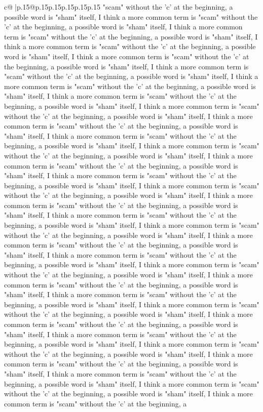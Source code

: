 \documentclass{article}
\begin{document}
{\begin{supertabular}{c@{$\;$}|p{.15\linewidth}@{}p{.15\linewidth}p{.15\linewidth}p{.15\linewidth}p{.15\linewidth}p{.15\linewidth}}
{{{"scam" without the 'c' at the beginning, a possible word is "sham" itself, I think a more common term is "scam" without the 'c' at the beginning, a possible word is "sham" itself, I think a more common term is "scam" without the 'c' at the beginning, a possible word is "sham" itself, I think a more common term is "scam" without the 'c' at the beginning, a possible word is "sham" itself, I think a more common term is "scam" without the 'c' at the beginning, a possible word is "sham" itself, I think a more common term is "scam" without the 'c' at the beginning, a possible word is "sham" itself, I think a more common term is "scam" without the 'c' at the beginning, a possible word is "sham" itself, I think a more common term is "scam" without the 'c' at the beginning, a possible word is "sham" itself, I think a more common term is "scam" without the 'c' at the beginning, a possible word is "sham" itself, I think a more common term is "scam" without the 'c' at the beginning, a possible word is "sham" itself, I think a more common term is "scam" without the 'c' at the beginning, a possible word is "sham" itself, I think a more common term is "scam" without the 'c' at the beginning, a possible word is "sham" itself, I think a more common term is "scam" without the 'c' at the beginning, a possible word is "sham" itself, I think a more common term is "scam" without the 'c' at the beginning, a possible word is "sham" itself, I think a more common term is "scam" without the 'c' at the beginning, a possible word is "sham" itself, I think a more common term is "scam" without the 'c' at the beginning, a possible word is "sham" itself, I think a more common term is "scam" without the 'c' at the beginning, a possible word is "sham" itself, I think a more common term is "scam" without the 'c' at the beginning, a possible word is "sham" itself, I think a more common term is "scam" without the 'c' at the beginning, a possible word is "sham" itself, I think a more common term is "scam" without the 'c' at the beginning, a possible word is "sham" itself, I think a more common term is "scam" without the 'c' at the beginning, a possible word is "sham" itself, I think a more common term is "scam" without the 'c' at the beginning, a possible word is "sham" itself, I think a more common term is "scam" without the 'c' at the beginning, a possible word is "sham" itself, I think a more common term is "scam" without the 'c' at the beginning, a possible word is "sham" itself, I think a more common term is "scam" without the 'c' at the beginning, a possible word is "sham" itself, I think a more common term is "scam" without the 'c' at the beginning, a possible word is "sham" itself, I think a more common term is "scam" without the 'c' at the beginning, a possible word is "sham" itself, I think a more common term is "scam" without the 'c' at the beginning, a possible word is "sham" itself, I think a more common term is "scam" without the 'c' at the beginning, a possible word is "sham" itself, I think a more common term is "scam" without the 'c' at the beginning, a possible word is "sham" itself, I think a more common term is "scam" without the 'c' at the beginning, a }}}
\end{supertabular}}
\end{document}
